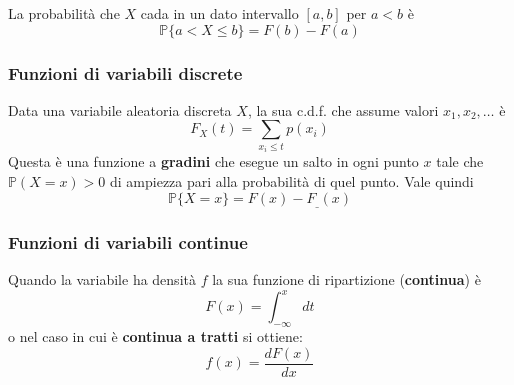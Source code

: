 \begin{proposition}
	La probabilità che $X$ cada in un dato intervallo $[a,b]$ per $a<b$ è
	\begin{equation}
		\mathbb{P}\{a < X \leq b\}=F(b)-F(a)
	\end{equation}
\end{proposition}

\subsubsection{Funzioni di variabili discrete}
Data una variabile aleatoria discreta $X$, la sua c.d.f. che assume valori $x_1, x_2, \ldots$ è
\begin{equation}
	F_X(t) = \sum_{x_i \leq t}p(x_i)
\end{equation}
Questa è una funzione a \textbf{gradini} che esegue un salto in ogni punto $x$ tale che $\mathbb{P}(X=x)>0$ di ampiezza pari alla probabilità di quel punto. Vale quindi
\begin{equation}
	\mathbb{P}\{X=x\} = F(x) - F_\_(x)
\end{equation}
\subsubsection{Funzioni di variabili continue}
Quando la variabile ha densità $f$ la sua funzione di ripartizione (\textbf{continua}) è
\begin{equation}
	F(x)=\int_{-\infty}^{x}dt
\end{equation}
o nel caso in cui è \textbf{continua a tratti} si ottiene:
\begin{equation}
	f(x) = \frac{dF(x)}{dx}
\end{equation}

